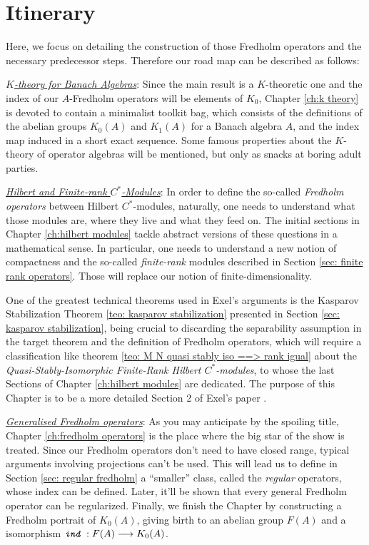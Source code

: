 \section*{Itinerary}
\thispagestyle{empty}
Here, we focus on detailing the construction of those Fredholm operators and the necessary predecessor steps. Therefore our road map can be described as follows:
\begin{itroman}
	\item \underline{\textit{$K$-theory for Banach Algebras}}: Since the main result is a $K$-theoretic one and the index of our $A$-Fredholm operators will be elements of $K_0$, Chapter \ref{ch:k theory} is devoted to contain a minimalist toolkit bag, which consists of the definitions of the abelian groups $K_0(A)$ and $K_1(A)$ for a Banach algebra $A$, and the index map induced in a short exact sequence. Some famous properties about the $K$-theory of operator algebras will be mentioned, but only as snacks at boring adult parties.
	\item \underline{\textit{Hilbert and Finite-rank \ensuremath{C^*}-Modules}}: In order to define the so-called \textit{Fredholm operators} between Hilbert $C^*$-modules, naturally, one needs to understand what those modules are, where they live and what they feed on. The initial sections in Chapter \ref{ch:hilbert modules} tackle abstract versions of these questions in a mathematical sense. In particular, one needs to understand a new notion of compactness and the so-called  \textit{finite-rank} modules described in Section \ref{sec: finite rank operators}. Those will replace our notion of finite-dimensionality. 
	
	One of the greatest technical theorems used in Exel's arguments is the Kasparov Stabilization Theorem \ref{teo: kasparov stabilization} presented in Section \ref{sec: kasparov stabilization}, being crucial to discarding the separability assumption in the target theorem and the definition of Fredholm operators, which will require a classification like theorem \ref{teo: M N quasi stably iso ==> rank igual} about the \textit{Quasi-Stably-Isomorphic Finite-Rank Hilbert $C^*$-modules}, to whose the last Sections of Chapter \ref{ch:hilbert modules} are dedicated. The purpose of this Chapter is to be a more detailed Section 2 of Exel's paper \cite{exel7fredholm}.
	
	\item \underline{\textit{Generalised Fredholm operators}}: As you may anticipate by the spoiling title, Chapter \ref{ch:fredholm operators} is the place where the big star of the show is treated. Since our Fredholm operators don't need to have closed range, typical arguments involving projections can't be used. This will lead us to define in Section \ref{sec: regular fredholm} a ``smaller'' class, called the \textit{regular} operators, whose index can be defined. Later, it'll be shown that every general Fredholm operator can be regularized. Finally, we finish the Chapter by constructing a Fredholm portrait of $K_0(A)$, giving birth to an abelian group $F(A)$ and a isomorphism $\texttt{\textit{ind}}\, : F(A) \longrightarrow K_0(A)$.
	

\end{itroman}
